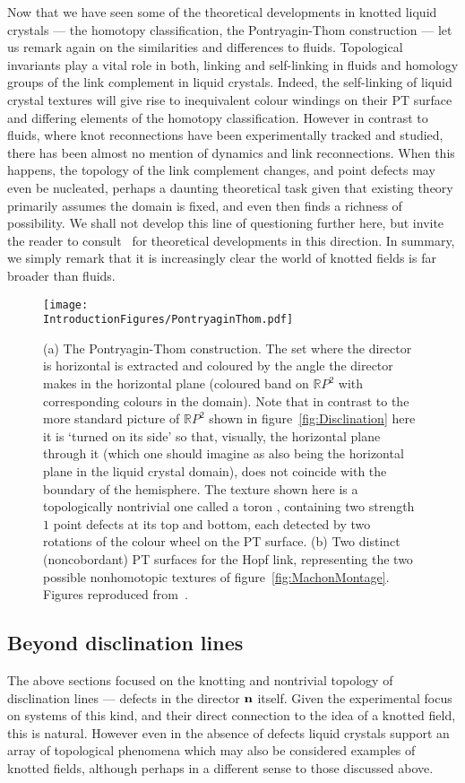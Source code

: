 Now that we have seen some of the theoretical developments in knotted liquid crystals --- the homotopy classification, the Pontryagin-Thom construction --- let us remark again on the similarities and differences to fluids. Topological invariants play a vital role in both, linking and self-linking in fluids and homology groups of the link complement in liquid crystals. Indeed, the self-linking of liquid crystal textures will give rise to inequivalent colour windings on their PT surface and differing elements of the homotopy classification. However in contrast to fluids, where knot reconnections have been experimentally tracked and studied, there has been almost no mention of dynamics and link reconnections. When this happens, the topology of the link complement changes, and point defects may even be nucleated, perhaps a daunting theoretical task given that existing theory primarily assumes the domain is fixed, and even then finds a richness of possibility. We shall not develop this line of questioning further here, but invite the reader to consult~\citep{Machon2017} for theoretical developments in this direction. In summary, we simply remark that it is increasingly clear the world of knotted fields is far broader than fluids.

\begin{figure}[htbp]
\centering
\texttt{[image: \\IntroductionFigures/PontryaginThom.pdf]}
\caption[The Pontryagin-Thom construction.]{(a) The Pontryagin-Thom construction. The set where the director is horizontal is extracted and coloured by the angle the director makes in the horizontal plane (coloured band on $\mathbb{R}P^2$ with corresponding colours in the domain). Note that in contrast to the more standard picture of $\mathbb{R}P^2$ shown in figure~\ref{fig:Disclination} here it is `turned on its side' so that, visually, the horizontal plane through it (which one should imagine as also being the horizontal plane in the liquid crystal domain), does not coincide with the boundary of the hemisphere. The texture shown here is a topologically nontrivial one called a toron \citep{Smalyukh2010}, containing two strength $1$ point defects at its top and bottom, each detected by two rotations of the colour wheel on the PT surface. (b) Two distinct (noncobordant) PT surfaces for the Hopf link, representing the two possible nonhomotopic textures of figure~\ref{fig:MachonMontage}. Figures reproduced from~\citep{AlexanderBook,MachonThesis}.}
\label{fig:PT}
\end{figure}
\subsection{Beyond disclination lines}
The above sections focused on the knotting and nontrivial topology of disclination lines --- defects in the director $\bf n$ itself. Given the experimental focus on systems of this kind, and their direct connection to the idea of a knotted field, this is natural. However even in the absence of defects liquid crystals support an array of topological phenomena which may also be considered examples of knotted fields, although perhaps in a different sense to those discussed above. 

